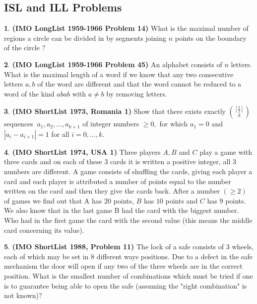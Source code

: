 \documentclass{article}
\theoremstyle{definition}
\newtheorem{p}{}
\begin{document}
\subsection{ISL and ILL Problems}


\begin{p}{\bf(IMO LongList 1959-1966 Problem 14)}
What is the maximal number of regions a circle can be divided in by segments joining $n$ points on the boundary of the circle ? 
\end{p}



\begin{p}{\bf(IMO LongList 1959-1966 Problem 45)}
An alphabet consists of $n$ letters. What is the maximal length of a word if we know that any two consecutive letters $a,b$ of the word are different and that the word cannot be reduced to a word of the kind $abab$ with $a\neq b$ by removing letters.
\end{p}





\begin{p}{\bf (IMO ShortList 1973, Romania 1)}
Show that there exists exactly $\binom{\left[ \frac{k}{2} \right]}{k}$ sequences $\ a_{1}, a_{2}, \ldots, a_{k+1}$ of integer numbers $\geq 0,$ for which $a_{1}=0$ and $|a_{i} - a_{i+1}|=1$ for all $i = 0, \ldots, k.$
\end{p}




\begin{p}{\bf (IMO ShortList 1974, USA 1)}
Three players $A,B$ and $C$ play a game with three cards and on each of these $3$ cards it is written a positive integer, all $3$ numbers are different. A game consists of shuffling the cards, giving each player a card and each player is attributed a number of points equal to the number written on the card and then they give the cards back. After a number $(\geq 2)$ of games we find out that A has $20$ points, $B$ has $10$ points and $C$ has $9$ points. We also know that in the last game B had the card with the biggest number. Who had in the first game the card with the second value (this means the middle card concerning its value).
\end{p}






\begin{p}{\bf(IMO ShortList 1988, Problem 11)}
The lock of a safe consists of 3 wheels, each of which may be set in 8 different ways positions. Due to a defect in the safe mechanism the door will open if any two of the three wheels are in the correct position. What is the smallest number of combinations which must be tried if one is to guarantee being able to open the safe (assuming the "right combination" is not known)?
\end{p}
\end{document}

